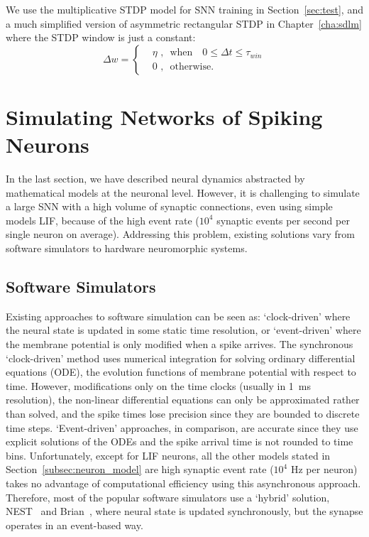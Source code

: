 We use the multiplicative STDP model for SNN training in Section~\ref{sec:test}, and a much simplified version of asymmetric rectangular STDP in Chapter~\ref{cha:sdlm} where the STDP window is just a constant:
\begin{equation}
\Delta w = \left\{
\begin{aligned}
&\eta \textrm{~,~~when~~~} 0 \leq \Delta  t \leq \tau_{win}\\
& 0 \textrm{~,~~otherwise}.
\end{aligned}
\right.
\end{equation}

\section{Simulating Networks of Spiking Neurons}
\label{sec:snn_sim}
In the last section, we have described neural dynamics \DIFdelbegin {}\DIFdelend \DIFaddbegin {}\DIFaddend abstracted by mathematical models at the neuronal level.
However, it is challenging to simulate a large SNN with a high volume of synaptic connections, even using simple models \DIFdelbegin {}\DIFdelend \DIFaddbegin {}\DIFaddend LIF, because of the high event rate ($10^4$ synaptic events per second per single neuron on average).
Addressing this problem, existing solutions vary from software simulators to hardware neuromorphic systems.

\subsection{Software Simulators}
Existing approaches to software simulation can be seen as: `clock-driven' where the neural state is updated in some static time resolution, or `event-driven' where the membrane potential is only modified when a spike arrives.
The synchronous `clock-driven' method uses numerical integration for solving ordinary differential equations (ODE), the evolution functions of membrane potential with respect to time.
However, modifications only on the time clocks (usually in 1~ms resolution), the non-linear differential equations can only be approximated rather than solved, and the spike times lose precision since they are bounded to discrete time steps.
`Event-driven' approaches, in comparison, are accurate since they use explicit solutions of the ODEs and the spike arrival time is not rounded to time bins.
Unfortunately, except for LIF neurons, all the other models stated in Section~\ref{subsec:neuron_model} are \DIFdelbegin {}\DIFdelend \DIFaddbegin {}\DIFaddend high synaptic event rate ($10^4$ Hz per neuron) takes no advantage of computational efficiency using this asynchronous approach.
Therefore, most of the popular software simulators use a `hybrid' solution, \DIFdelbegin {}\DIFdelend \DIFaddbegin {}\DIFaddend NEST~\citep{gewaltig2007nest} and Brian~\citep{goodman2008brian}, where 
neural state is updated synchronously, but the synapse operates in an event-based way.

